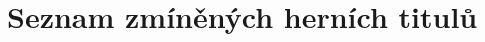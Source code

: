 \chapter{Seznam zmíněných herních titulů}
\label{chap:game-list}

\renewcommand{\glossarysection}[2][]{}
\printnoidxglossary[]